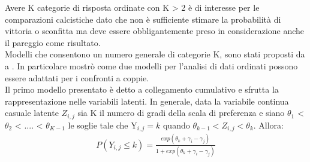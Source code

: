 Avere K categorie di risposta ordinate con K > 2 è di interesse per le comparazioni calcistiche dato che non è sufficiente stimare la probabilità di vittoria o sconfitta ma deve essere obbligantemente preso in considerazione anche il pareggio come risultato.\\

Modelli che consentono un numero generale di categorie K, sono stati proposti da \autocite{bradley1952rank} a \autocite{tutz1986bradley} . In particolare \autocite{tutz1986bradley} mostrò come due modelli per l'analisi di dati ordinati possono essere adattati per i confronti a coppie.\\

Il primo modello presentato è detto a collegamento cumulativo e sfrutta la rappresentazione nelle variabili latenti. In generale, data la variabile continua casuale latente $Z_{i,j}$ sia K il numero di gradi della scala di preferenza e siano $\theta_{1} $ < $\theta_{2}$ < .... < $\theta_{K-1}$ le soglie tale che Y$_{i,j} = k$ quando $\theta_{k-1} < Z_{i,j} < \theta_{k}$. Allora:
\begin{align}
	P(Y_{i,j}\leq k) =  \frac{exp(\theta_{k} + \gamma_{i} - \gamma_{j})}{1 + exp(\theta_{k} + \gamma_{i} - \gamma_{j})} \label{for:3.2.1}
\end{align}

